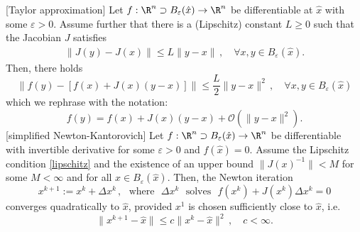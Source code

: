 [Taylor approximation]\label{taylor}
Let $f:\R^n\supset B_\varepsilon(\hat{x})\to\R^n$ be differentiable at $\hat{x}$ with some $\varepsilon>0$. Assume further that there is a (Lipschitz) constant $L \geq 0$ such that the Jacobian  $J$
satisfies
\begin{align}
 \|J(y)-J(x)\|\le L\|y-x\|\, ,\quad\forall x,y\in B_\varepsilon(\hat{x}). \label{lipschitz}
\end{align}
Then, there holds
$$
\|f(y)-\left[f(x)+J(x)(y-x)\right]\|\le \frac{L}{2}\|y-x\|^2\, ,\quad\forall x,y\in B_\varepsilon(\hat{x})
$$
which we rephrase with the notation:
$$
f(y)=f(x)+J(x)(y-x) + \mathcal{O}(\|y-x\|^2).
$$
[simplified Newton-Kantorovich]
Let $f:\R^n\supset B_\varepsilon(\hat{x})\to\R^n$ be differentiable with invertible derivative for some $\varepsilon>0$ and $f(\hat{x})=0$. Assume the Lipschitz condition \eqref{lipschitz} and the existence of an upper bound $\|J(x)^{-1}\|<M$ for some $M<\infty$ and for all $x\in B_\varepsilon(\hat{x})$. Then, the Newton iteration
\[
\boxed{x^{k+1}:=x^k+\Delta x^k\, , \text{~ where~ }\Delta x^k\text{~ solves~ }f(x^k)+J(x^k)\Delta x^k=0}
\]
converges quadratically to $\hat{x}$, provided $x^1$ is chosen sufficiently close to $\hat{x}$, i.e.
\[
\|x^{k+1}-\hat{x}\|\le c \|x^{k}-\hat{x}\|^2\, ,\quad c<\infty.
\]

